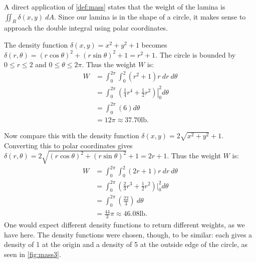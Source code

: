 {A direct application of \autoref{def:mass} states that the weight of the lamina is $\iint_R\delta(x,y)\ dA$. Since our lamina is in the shape of a circle, it makes sense to approach the double integral using polar coordinates.

The density function $\delta(x,y) = x^2+y^2+1$ becomes $\delta(r,\theta) = (r\cos\theta)^2+(r\sin\theta)^2+1 = r^2+1$. The circle is bounded by $0\leq r\leq 2$ and $0\leq\theta\leq2\pi$. Thus the weight $W$ is:
\begin{align*}
W &= \int_0^{2\pi}\int_0^2 (r^2+1)r\ dr\ d\theta\\
	&= \int_0^{2\pi} \left.\left(\frac14r^4+\frac12r^2\right)\right|_0^2d\theta\\
	&= \int_0^{2\pi} \left(6\right) d\theta\\
	&= 12\pi \approx 37.70\text{lb}.
\end{align*}

Now compare this with the density function $\delta(x,y) = 2\sqrt{x^2+y^2}+1$. Converting this to polar coordinates gives $\delta(r,\theta) = 2\sqrt{(r\cos\theta)^2+(r\sin\theta)^2}+1 = 2r+1$. Thus the weight $W$ is:
\begin{align*}
W &= \int_0^{2\pi}\int_0^2 (2r+1)r\ dr\ d\theta\\
	&= \int_0^{2\pi} (\frac23r^3+\frac12r^2)\Big|_0^2d\theta\\
	&= \int_0^{2\pi} \left(\frac{22}3\right)\ d\theta\\
	&= \frac{44}3\pi \approx 46.08\text{lb}.
\end{align*}
One would expect different density functions to return different weights, as we have here. The density functions were chosen, though, to be similar: each gives a density of 1 at the origin and a density of 5 at the outside edge of the circle, as seen in \autoref{fig:mass3}.\\

}
